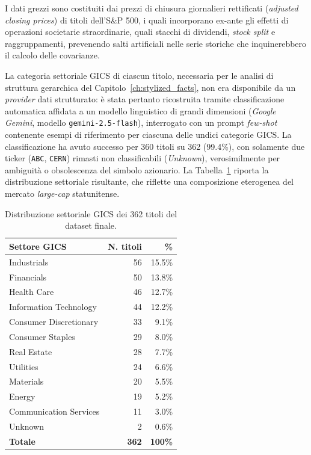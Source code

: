 I dati grezzi sono costituiti dai prezzi di chiusura giornalieri rettificati (\emph{adjusted closing prices}) di titoli dell'S\&P 500, i quali incorporano ex-ante gli effetti di operazioni societarie straordinarie, quali stacchi di dividendi, \emph{stock split} e raggruppamenti, prevenendo salti artificiali nelle serie storiche che inquinerebbero il calcolo delle covarianze.

La categoria settoriale GICS di ciascun titolo, necessaria per le analisi di struttura gerarchica del Capitolo~\ref{ch:stylized_facts}, non era disponibile da un \emph{provider} dati strutturato: è stata pertanto ricostruita tramite classificazione automatica affidata a un modello linguistico di grandi dimensioni (\emph{Google Gemini}, modello \texttt{gemini-2.5-flash}), interrogato con un prompt \emph{few-shot} contenente esempi di riferimento per ciascuna delle undici categorie GICS. La classificazione ha avuto successo per 360 titoli su 362 (99.4\%), con solamente due ticker (\texttt{ABC}, \texttt{CERN}) rimasti non classificabili (\emph{Unknown}), verosimilmente per ambiguità o obsolescenza del simbolo azionario. La Tabella~\ref{tab:gics_distribution} riporta la distribuzione settoriale risultante, che riflette una composizione eterogenea del mercato \emph{large-cap} statunitense.

\begin{table}[!ht]
\centering
\begin{tabular}{lrr}
\hline
\textbf{Settore GICS} & \textbf{N. titoli} & \textbf{\%} \\
\hline
Industrials & 56 & 15.5\% \\
Financials & 50 & 13.8\% \\
Health Care & 46 & 12.7\% \\
Information Technology & 44 & 12.2\% \\
Consumer Discretionary & 33 & 9.1\% \\
Consumer Staples & 29 & 8.0\% \\
Real Estate & 28 & 7.7\% \\
Utilities & 24 & 6.6\% \\
Materials & 20 & 5.5\% \\
Energy & 19 & 5.2\% \\
Communication Services & 11 & 3.0\% \\
Unknown & 2 & 0.6\% \\
\hline
\textbf{Totale} & \textbf{362} & \textbf{100\%} \\
\hline
\end{tabular}
\caption{Distribuzione settoriale GICS dei 362 titoli del dataset finale.}
\label{tab:gics_distribution}
\end{table}

